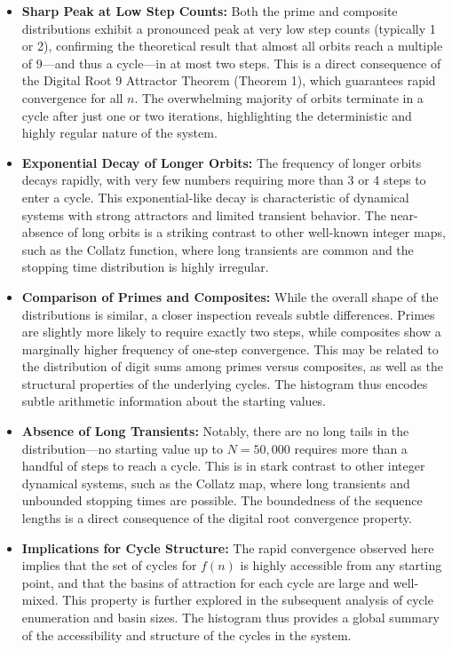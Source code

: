 \documentclass[12pt]{article}
\begin{document}
\begin{itemize}
    \item \textbf{Sharp Peak at Low Step Counts:} Both the prime and composite distributions exhibit a pronounced peak at very low step counts (typically 1 or 2), confirming the theoretical result that almost all orbits reach a multiple of $9$---and thus a cycle---in at most two steps. This is a direct consequence of the Digital Root 9 Attractor Theorem (Theorem 1), which guarantees rapid convergence for all $n$. The overwhelming majority of orbits terminate in a cycle after just one or two iterations, highlighting the deterministic and highly regular nature of the system.
    \item \textbf{Exponential Decay of Longer Orbits:} The frequency of longer orbits decays rapidly, with very few numbers requiring more than 3 or 4 steps to enter a cycle. This exponential-like decay is characteristic of dynamical systems with strong attractors and limited transient behavior. The near-absence of long orbits is a striking contrast to other well-known integer maps, such as the Collatz function, where long transients are common and the stopping time distribution is highly irregular.
    \item \textbf{Comparison of Primes and Composites:} While the overall shape of the distributions is similar, a closer inspection reveals subtle differences. Primes are slightly more likely to require exactly two steps, while composites show a marginally higher frequency of one-step convergence. This may be related to the distribution of digit sums among primes versus composites, as well as the structural properties of the underlying cycles. The histogram thus encodes subtle arithmetic information about the starting values.
    \item \textbf{Absence of Long Transients:} Notably, there are no long tails in the distribution---no starting value up to $N=50,000$ requires more than a handful of steps to reach a cycle. This is in stark contrast to other integer dynamical systems, such as the Collatz map, where long transients and unbounded stopping times are possible. The boundedness of the sequence lengths is a direct consequence of the digital root convergence property.
    \item \textbf{Implications for Cycle Structure:} The rapid convergence observed here implies that the set of cycles for $f(n)$ is highly accessible from any starting point, and that the basins of attraction for each cycle are large and well-mixed. This property is further explored in the subsequent analysis of cycle enumeration and basin sizes. The histogram thus provides a global summary of the accessibility and structure of the cycles in the system.
\end{itemize}
\end{document}
